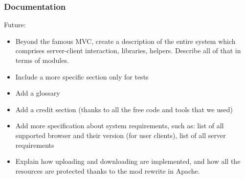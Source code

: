 \subsubsection{Documentation}
Future:
\begin{itemize}
\item Beyond the famous MVC, create a description of the entire system which comprises server-client interaction, libraries, helpers. Describe all of that in terms of modules.
\item Include a more specific section only for tests
\item Add a glossary
\item Add a credit section (thanks to all the free code and tools that we used)
\item Add more specification about system requirements, such as: list of all supported browser and their version (for user clients), list of all server requirements
\item Explain how uploading and downloading are implemented, and how all the resources are protected thanks to the mod rewrite in Apache. 
\end{itemize}
